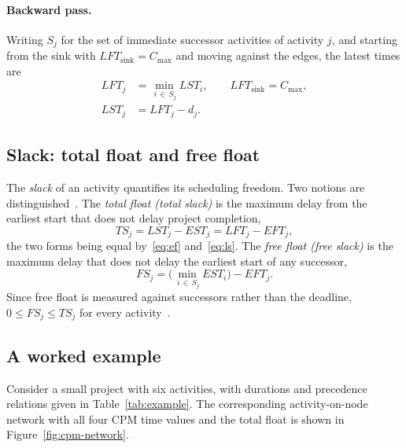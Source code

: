 \paragraph{Backward pass.}
Writing $S_j$ for the set of immediate successor activities of activity $j$,
and starting from the sink with $LFT_{\text{sink}} = C_{\max}$ and moving
against the edges, the latest times are
\begin{align}
  LFT_j &= \min_{\,i \,\in\, S_j} LST_i,
         \qquad LFT_{\text{sink}} = C_{\max}, \label{eq:lf}\\[2pt]
  LST_j &= LFT_j - d_j. \label{eq:ls}
\end{align}

\subsection{Slack: total float and free float}
\label{subsec:slack}

The \emph{slack}  of an activity quantifies its scheduling
freedom. Two notions are distinguished~\cite{demeulemeester2002}. The
\emph{total float (total slack)} is the maximum delay from the earliest start
that does not delay project completion,
\begin{equation}
  TS_j = LST_j - EST_j = LFT_j - EFT_j, \label{eq:ts}
\end{equation}
the two forms being equal by~\eqref{eq:ef} and~\eqref{eq:ls}. The \emph{free
float (free slack)} is the maximum delay that does not delay the earliest
start of any successor,
\begin{equation}
  FS_j = \Big(\min_{\,i\,\in\,S_j} EST_i\Big) - EFT_j. \label{eq:fs}
\end{equation}
Since free float is measured against successors rather than the deadline,
$0 \le FS_j \le TS_j$ for every activity~\cite{demeulemeester2002}.

\subsection{A worked example}
\label{subsec:worked-example}

Consider a small project with six activities, with durations and precedence
relations given in Table~\ref{tab:example}. The corresponding activity-on-node
network with all four CPM time values and the total float is shown in
Figure~\ref{fig:cpm-network}.

